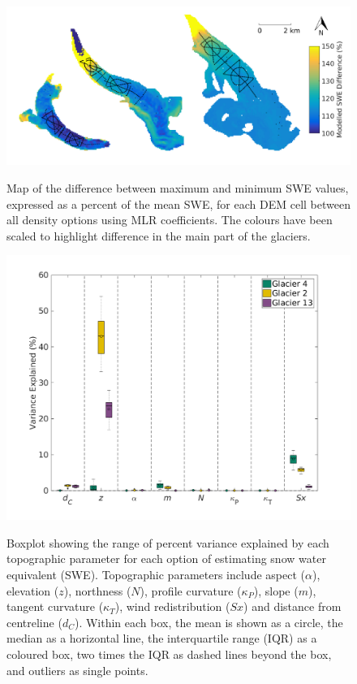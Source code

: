 \documentclass[12pt]{article}
\begin{document}
 \begin{figure}[H]
	\centering
	\includegraphics[width =\textwidth]{MLR_SWEdifferenceMap_percent.png}\\
	\caption{Map of the difference between maximum and minimum SWE values, expressed as a percent of the mean SWE, for each DEM cell between all density options using MLR coefficients. The colours have been scaled to highlight difference in the main part of the glaciers.}
	\label{fig:MLR_SWEdiffMapPercent}
\end{figure}
 
\begin{figure}[H]
	\centering
	\includegraphics[width =1.1 \textwidth]{Coeffs_DensityOpts.png}\\
	\caption{Boxplot showing the range of percent variance explained by each topographic parameter for each option of estimating snow water equivalent (SWE). Topographic parameters include aspect ($\alpha$), elevation ($z$), northness ($N$), profile curvature ($\kappa_P$), slope ($m$), tangent curvature ($\kappa_T$), wind redistribution ($Sx$) and distance from centreline ($d_C$). Within each box, the mean is shown as a circle, the median as a horizontal line, the interquartile range (IQR) as a coloured box, two times the IQR as dashed lines beyond the box, and outliers as single points.}
	\label{fig:MLRPercentVar_densityOptions}
\end{figure} 
\end{document}
